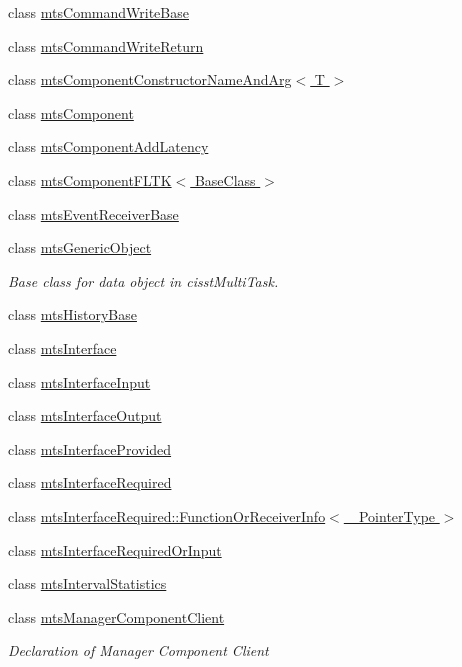 \begin{DoxyCompactItemize}
\item 
class \hyperlink{classmts_command_write_base}{mts\+Command\+Write\+Base}
\item 
class \hyperlink{classmts_command_write_return}{mts\+Command\+Write\+Return}
\item 
class \hyperlink{classmts_component_constructor_name_and_arg}{mts\+Component\+Constructor\+Name\+And\+Arg$<$ T $>$}
\item 
class \hyperlink{classmts_component}{mts\+Component}
\item 
class \hyperlink{classmts_component_add_latency}{mts\+Component\+Add\+Latency}
\item 
class \hyperlink{classmts_component_f_l_t_k}{mts\+Component\+F\+L\+T\+K$<$ Base\+Class $>$}
\item 
class \hyperlink{classmts_event_receiver_base}{mts\+Event\+Receiver\+Base}
\item 
class \hyperlink{classmts_generic_object}{mts\+Generic\+Object}
\begin{DoxyCompactList}\small\item\em Base class for data object in cisst\+Multi\+Task. \end{DoxyCompactList}\item 
class \hyperlink{classmts_history_base}{mts\+History\+Base}
\item 
class \hyperlink{classmts_interface}{mts\+Interface}
\item 
class \hyperlink{classmts_interface_input}{mts\+Interface\+Input}
\item 
class \hyperlink{classmts_interface_output}{mts\+Interface\+Output}
\item 
class \hyperlink{classmts_interface_provided}{mts\+Interface\+Provided}
\item 
class \hyperlink{classmts_interface_required}{mts\+Interface\+Required}
\item 
class \hyperlink{classmts_interface_required_1_1_function_or_receiver_info}{mts\+Interface\+Required\+::\+Function\+Or\+Receiver\+Info$<$ \+\_\+\+Pointer\+Type $>$}
\item 
class \hyperlink{classmts_interface_required_or_input}{mts\+Interface\+Required\+Or\+Input}
\item 
class \hyperlink{classmts_interval_statistics}{mts\+Interval\+Statistics}
\item 
class \hyperlink{classmts_manager_component_client}{mts\+Manager\+Component\+Client}
\begin{DoxyCompactList}\small\item\em Declaration of Manager Component Client


\end{DoxyCompactList}
\end{DoxyCompactItemize}
